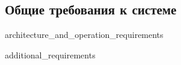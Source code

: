 \subsection{Общие требования к системе}


{architecture_and_operation_requirements}


{additional_requirements}
